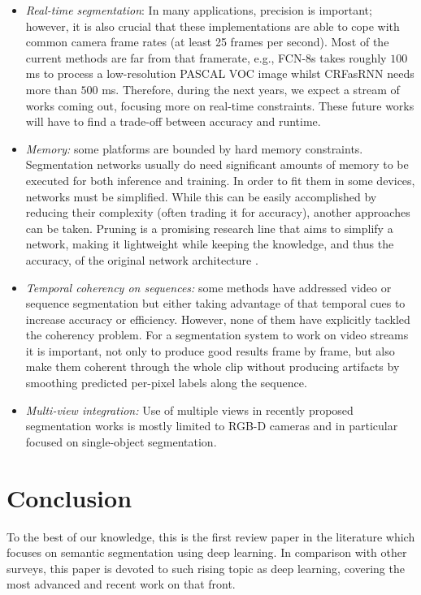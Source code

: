 \begin{itemize}
	\item \emph{Real-time segmentation}: In many applications, precision is important; however, it is also crucial that these implementations are able to cope with common camera frame rates (at least 25 frames per second). Most of the current methods are far from that framerate, e.g., \acs{FCN}-8s takes roughly $100$ ms to process a low-resolution PASCAL \acs{VOC} image whilst \acs{CRF}as\acs{RNN} needs more than $500$ ms. Therefore, during the next years, we expect a stream of works coming out, focusing more on real-time constraints. These future works will have to find a trade-off between accuracy and runtime.
	\item \emph{Memory:} some platforms are bounded by hard memory constraints. Segmentation networks usually do need significant amounts of memory to be executed for both inference and training. In order to fit them in some devices, networks must be simplified. While this can be easily accomplished by reducing their complexity (often trading it for accuracy), another approaches can be taken. Pruning is a promising research line that aims to simplify a network, making it lightweight while keeping the knowledge, and thus the accuracy, of the original network architecture \cite{Anwar2015}\cite{Han2015}\cite{Molchanov2016}.
	\item \emph{Temporal coherency on sequences:} some methods have addressed video or sequence segmentation but either taking advantage of that temporal cues to increase accuracy or efficiency. However, none of them have explicitly tackled the coherency problem. For a segmentation system to work on video streams it is important, not only to produce good results frame by frame, but also make them coherent through the whole clip without producing artifacts by smoothing predicted per-pixel labels along the sequence.
	\item \emph{Multi-view integration:} Use of multiple views in recently proposed segmentation works is mostly limited to RGB-D cameras and in particular focused on single-object segmentation.
\end{itemize}

\section{Conclusion}
\label{sec:conclusion}

To the best of our knowledge, this is the first review paper in the literature which focuses on semantic segmentation using deep learning. In comparison with other surveys, this paper is devoted to such rising topic as deep learning, covering the most advanced and recent work on that front.


